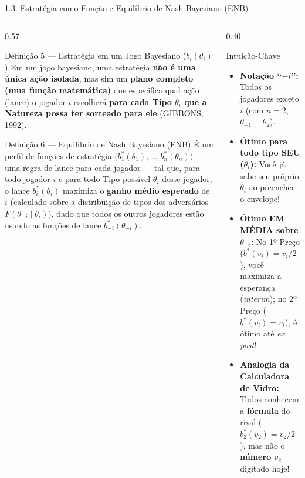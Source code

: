 \documentclass[aspectratio=169, 10pt]{beamer}
\newcommand{\defbox}[2]{%
  \begin{block}{#1}
    \footnotesize\setlength{\abovedisplayskip}{4pt}\setlength{\belowdisplayskip}{4pt}
    #2\par
  \end{block}%
}
\newcommand{\exbox}[2]{%
  \begin{exampleblock}{#1}
    \footnotesize\setlength{\abovedisplayskip}{4pt}\setlength{\belowdisplayskip}{4pt}
    #2\par
  \end{exampleblock}%
}
\begin{document}
\begin{frame}{1.3. Estratégia como Função e Equilíbrio de Nash Bayesiano (ENB)}
  \begin{columns}[T, onlytextwidth]
    \begin{column}{0.57\textwidth}
      \defbox{Definição 5 --- Estratégia em um Jogo Bayesiano
      ($b_i(\theta_i)$)}{%
        Em um jogo bayesiano, uma estratégia \textbf{não é uma única
        ação isolada}, mas sim um \textbf{plano completo (uma função
        matemática)} que especifica qual ação (lance) o jogador $i$
        escolherá \textbf{para cada Tipo $\theta_i$ que a Natureza
        possa ter sorteado para ele} (GIBBONS, 1992).
      }
      \vspace{0.08cm}
      \defbox{Definição 6 --- Equilíbrio de Nash Bayesiano (ENB)}{%
        É um perfil de funções de estratégia
        $\big(b_1^\ast(\theta_1), \dots, b_n^\ast(\theta_n)\big)$ ---
        uma regra de lance para cada jogador --- tal que, para todo
        jogador $i$ e para todo Tipo possível $\theta_i$ desse
        jogador, o lance $b_i^\ast(\theta_i)$ maximiza o
        \textbf{ganho médio esperado} de $i$ (calculado sobre a
          distribuição de tipos dos adversários $F(\theta_{-i} \mid
        \theta_i)$), dado que todos os outros jogadores estão usando
        as funções de lance $b_{-i}^\ast(\theta_{-i})$.
      }
    \end{column}
    \begin{column}{0.40\textwidth}
      \exbox{Intuição-Chave}{%
      \begin{itemize}\setlength{\itemsep}{3pt}
          \item \textbf{Notação ``$-i$'':} Todos os jogadores exceto
            $i$ (com $n=2$, $\theta_{-1} = \theta_2$).
          \item \textbf{Ótimo para todo tipo SEU ($\theta_i$):} Você
            já sabe seu próprio $\theta_i$ ao preencher o envelope!
          \item \textbf{Ótimo EM MÉDIA sobre $\theta_{-i}$:} No 1º
            Preço ($b^\ast(v_i)=v_i/2$), você maximiza a esperança
            (\textit{interim}); no 2º Preço ($b^\ast(v_i)=v_i$), é
            ótimo até \textit{ex post}!
          \item \textbf{Analogia da Calculadora de Vidro:} Todos
            conhecem a \textbf{fórmula} do rival
            ($b_2^\ast(v_2)=v_2/2$), mas não o \textbf{número $v_2$}
            digitado hoje!
        \end{itemize}
      }
    \end{column}
  \end{columns}
\end{frame}
\end{document}
